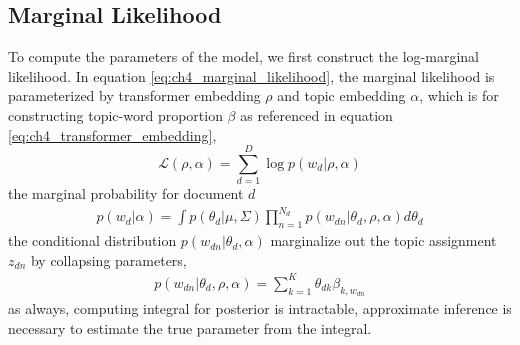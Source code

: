 \subsection{Marginal Likelihood}
To compute the parameters of the model, we first construct the log-marginal likelihood. In equation \ref{eq:ch4_marginal_likelihood}, the marginal likelihood is parameterized by transformer embedding $ \rho $ and topic embedding $ \alpha $, which is for constructing topic-word proportion $ \beta $ as referenced in equation \ref{eq:ch4_transformer_embedding},
\begin{equation}\label{eq:ch4_marginal_likelihood}
\mathcal{L}(\rho,\alpha)=\sum_{d=1}^{D}\log p(w_d|\rho,\alpha)
\end{equation}
the marginal probability for document $ d $
\begin{align}
p(w_d|\alpha)=\int p(\theta_d|\mu,\Sigma)\prod_{n=1}^{N_d}p(w_{dn}|\theta_d,\rho,\alpha)d\theta_d
\end{align}
the conditional distribution $ p(w_{dn}|\theta_d,\alpha) $ marginalize out the topic assignment $ z_{dn} $ by collapsing parameters,
\begin{align}
p(w_{dn}|\theta_d,\rho,\alpha)=\sum_{k=1}^{K}\theta_{dk}\beta_{k,w_{dn}}
\end{align}
as always, computing integral for posterior is intractable, approximate inference is necessary to estimate the true parameter from the integral.
